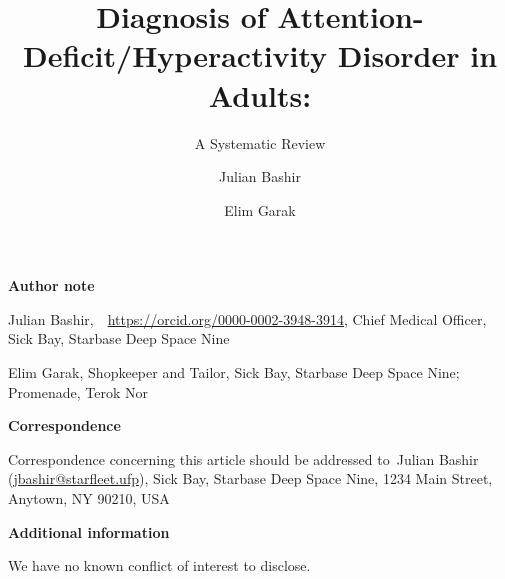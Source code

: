 \documentclass[
  12pt,
  letterpaper,
]{article}
\title{Diagnosis of Attention-Deficit/Hyperactivity Disorder in Adults:}
\subtitle{A Systematic Review}
\author[1]{Julian Bashir}
\author[1,2]{Elim Garak}
\affil[1]{Starbase Deep Space Nine}
\affil[2]{Terok Nor}
\date{}
\renewcommand{\[}{\begin{singlespace}\oldDisplayMath}
\renewcommand{\]}{\endoldDisplayMath\end{singlespace}\vspace{\baselineskip}}
\begin{document}

\begin{titlepage}
\center

{\let\newpage\relax\maketitle}

\thispagestyle{title}

\vspace{0.25in}


\vspace{0.5in}

\begin{center}

\textbf{Author note}

\raggedright\setlength{\parindent}{0.5in}Julian
Bashir,~~\url{https://orcid.org/0000-0002-3948-3914}, Chief
Medical Officer, Sick Bay, Starbase Deep Space Nine 

\raggedright\setlength{\parindent}{0.5in}Elim Garak, Shopkeeper and
Tailor, Sick Bay, Starbase Deep Space Nine; Promenade, Terok Nor 


\end{center}

\begin{center}

\textbf{Correspondence}

\par\raggedright\setlength{\parindent}{0.5in}Correspondence concerning
this article should be addressed to~Julian
Bashir (\href{mailto:jbashir@starfleet.ufp}{jbashir@starfleet.ufp}), Sick
Bay, Starbase Deep Space Nine, 1234 Main Street, Anytown, NY 90210, USA 

\end{center}

\begin{center}

\textbf{Additional information}

\par\raggedright\setlength{\parindent}{0.5in}We have no known conflict
of interest to disclose.


\end{center}
\end{titlepage}
\end{document}
